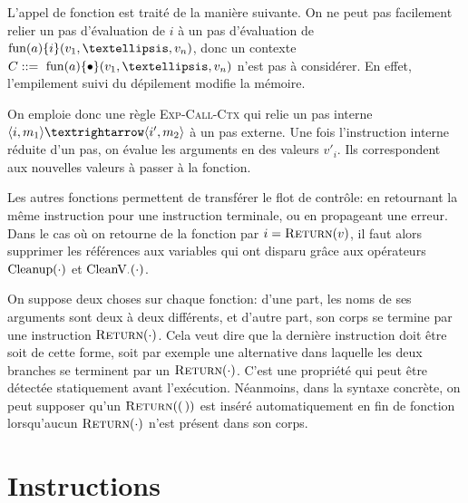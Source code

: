 


L'appel de fonction est traité de la manière suivante. On ne peut pas facilement
relier un pas d'évaluation de $i$ à un pas d'évaluation de $\eFun{a}{i}
(v_1,…,v_n)$, donc un contexte $C \gramisa \eFun{a}{\ctxEmpty} (v_1,…,v_n)$
n'est pas à considérer. En effet, l'empilement suivi du dépilement modifie la
mémoire.

On emploie donc une règle \textsc{Exp-Call-Ctx} qui relie un pas interne
$\mm{m_1}{i}{m_2}{i'}$ à un pas externe. Une fois l'instruction interne réduite
d'un pas, on évalue les arguments en des valeurs $v'_i$. Ils correspondent aux
nouvelles valeurs à passer à la fonction.

Les autres fonctions permettent de transférer le flot de contrôle: en retournant
la même instruction pour une instruction terminale, ou en propageant une erreur.
Dans le cas où on retourne de la fonction par $i = \iReturn{v}$, il faut alors
supprimer les références aux variables qui ont disparu grâce aux opérateurs
$\phx\cCleanup$ et $\phxx\cV$.

\label{page:return-fonction}
On suppose deux choses sur chaque fonction: d'une part, les noms de ses
arguments sont deux à deux différents, et d'autre part, son corps se termine par
une instruction $\iReturn{\cdot}$. Cela veut dire que la dernière instruction
doit être soit de cette forme, soit par exemple une alternative dans laquelle
les deux branches se terminent par un $\iReturn{\cdot}$. C'est une propriété qui
peut être détectée statiquement avant l'exécution. Néanmoins, dans la syntaxe
concrète, on peut supposer qu'un $\iReturn{\eUnit}$ est inséré automatiquement
en fin de fonction lorsqu'aucun $\iReturn{\cdot}$ n'est présent dans son corps.

\begin{mathpar}


\end{mathpar}

\section{Instructions}
\label{sec:eval-instr}

